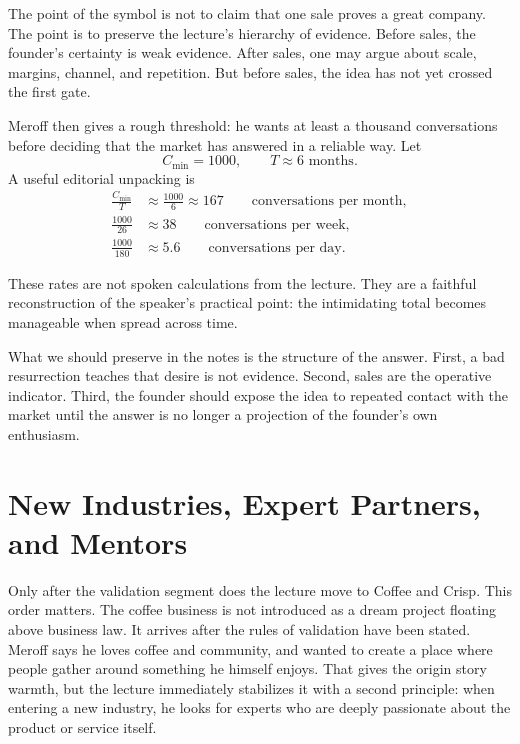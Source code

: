 The point of the symbol is not to claim that one sale proves a great company. The point is to preserve the lecture's hierarchy of evidence. Before sales, the founder's certainty is weak evidence. After sales, one may argue about scale, margins, channel, and repetition. But before sales, the idea has not yet crossed the first gate.

Meroff then gives a rough threshold: he wants at least a thousand conversations before deciding that the market has answered in a reliable way. Let
\begin{equation}
C_{\min}=1000,
\qquad
T \approx 6 \text{ months}.
\end{equation}
A useful editorial unpacking is
\begin{align}
\frac{C_{\min}}{T}
&\approx
\frac{1000}{6}
\approx
167
\qquad \text{conversations per month},\\
\frac{1000}{26}
&\approx
38
\qquad \text{conversations per week},\\
\frac{1000}{180}
&\approx
5.6
\qquad \text{conversations per day}.
\end{align}

\begin{remark}
These rates are not spoken calculations from the lecture. They are a faithful reconstruction of the speaker's practical point: the intimidating total becomes manageable when spread across time.
\end{remark}

What we should preserve in the notes is the structure of the answer. First, a bad resurrection teaches that desire is not evidence. Second, sales are the operative indicator. Third, the founder should expose the idea to repeated contact with the market until the answer is no longer a projection of the founder's own enthusiasm.

\section{New Industries, Expert Partners, and Mentors}

Only after the validation segment does the lecture move to Coffee and Crisp. This order matters. The coffee business is not introduced as a dream project floating above business law. It arrives after the rules of validation have been stated. Meroff says he loves coffee and community, and wanted to create a place where people gather around something he himself enjoys. That gives the origin story warmth, but the lecture immediately stabilizes it with a second principle: when entering a new industry, he looks for experts who are deeply passionate about the product or service itself.

